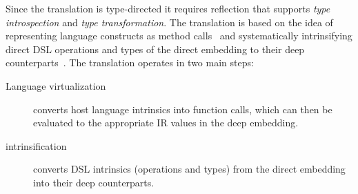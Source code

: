 Since the translation is type-directed it requires reflection that supports \emph{type introspection} and \emph{type transformation}. The translation is based on the idea of representing language constructs as method calls~\cite{carette_finally_2009,rompf_scala-virtualized:_2009} and systematically intrinsifying direct DSL operations and types of the direct embedding to their deep counterparts~\cite{carette_finally_2009}. The translation operates in two main steps:
\begin{description}
\item[Language virtualization] converts host language intrinsics into
  function calls, which can then be evaluated to the appropriate IR
  values in the deep embedding.
\item[\edsl{} intrinsification] converts DSL intrinsics (operations
  and types) from the direct embedding into their deep counterparts.
\end{description}



